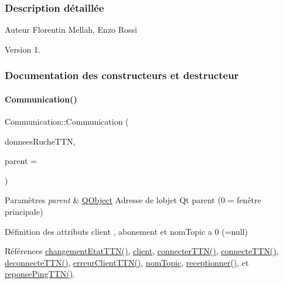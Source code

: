 \subsubsection{Description détaillée}
\begin{DoxyAuthor}{Auteur}
Florentin Mellah, Enzo Rossi
\end{DoxyAuthor}
\begin{DoxyVersion}{Version}
1. 
\end{DoxyVersion}


\subsubsection{Documentation des constructeurs et destructeur}
\mbox{\label{class_communication_a7376830f5598b7e3c0eb4434a8a8766e}} 
\paragraph{\texorpdfstring{Communication()}{Communication()}}
{\footnotesize\ttfamily Communication\+::\+Communication (\begin{DoxyParamCaption}\item[{Q\+String\+List}]{donnees\+Ruche\+T\+TN,  }\item[{\hyperlink{class_q_object}{Q\+Object} $\ast$}]{parent = {} }\end{DoxyParamCaption})}


\begin{DoxyParams}{Paramètres}
{\em parent} & \hyperlink{class_q_object}{Q\+Object} Adresse de l\textquotesingle{}objet Qt parent (0 = fenêtre principale)\\
\hline
\end{DoxyParams}
Définition des attributs client , abonement et nom\+Topic a 0 (=null) 

Références \hyperlink{class_communication_af249c498d61b4288b9e7d388baf81fc2}{changement\+Etat\+T\+T\+N()}, \hyperlink{class_communication_a59ae01a54d6c3fde6242c46d802b954b}{client}, \hyperlink{class_communication_aadec726c44e719fa587bd385533eb559}{connecter\+T\+T\+N()}, \hyperlink{class_communication_af71587fb1ee9b7460345b7c12372a1eb}{connecte\+T\+T\+N()}, \hyperlink{class_communication_ab0f5a47c2fc7dbca198bfab2c0ac65bb}{deconnecte\+T\+T\+N()}, \hyperlink{class_communication_ae1a84ffd9317d0e4e27a6633cef43b64}{erreur\+Client\+T\+T\+N()}, \hyperlink{class_communication_a7d536b64ee7a5373047c292477d391d5}{nom\+Topic}, \hyperlink{class_communication_a9a0c0ce96c86cbb3e59529b2334819f3}{receptionner()}, et \hyperlink{class_communication_a2921a3a80cdcb10f7f63c3bd779d7129}{reponse\+Ping\+T\+T\+N()}.


